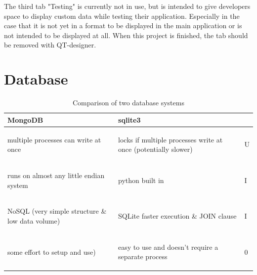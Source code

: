 \documentclass[]{scrreprt}
\begin{document}
	The third tab "Testing" is currently not in use, but is intended to give developers space to display custom data while testing their application. Especially in the case that it is not yet in a format to be displayed in the main application or is not intended to be displayed at all. When this project is finished, the tab should be removed with QT-designer.
	
\chapter{Database}
	
	\begin{table}[H]
		
		\centering
		\begin{tabular}{|l|l|l|}
			\hline
			MongoDB & sqlite3 & \\
			\hline \hline
			\begin{pbox}{6.0cm}{\vspace{.2\baselineskip}multiple processes can write at once\vspace{.3\baselineskip}} \end{pbox} & \begin{pbox}{6.0cm}{\vspace{.2\baselineskip}locks if multiple processes write at once (potentially slower)\vspace{.3\baselineskip}} \end{pbox} & U\\
			\hline
			\begin{pbox}{6.5cm}{\vspace{.2\baselineskip}runs on almost any little endian system\vspace{.3\baselineskip}} \end{pbox}
			& python built in & I\\
			\hline
			\begin{pbox}{6.0cm}{\vspace{.2\baselineskip}NoSQL (very simple structure \& low data volume)\vspace{.3\baselineskip}} \end{pbox} & \begin{pbox}{6.0cm}{\vspace{.2\baselineskip}SQLite faster execution \& JOIN clause\vspace{.3\baselineskip}} \end{pbox} & I \\
			\hline
			\begin{pbox}{6.0cm}{\vspace{.2\baselineskip}some effort to setup and use)\vspace{.3\baselineskip}} \end{pbox} & \begin{pbox}{6.0cm}{\vspace{.2\baselineskip}easy to use and doesn't require a separate process \vspace{.3\baselineskip}} \end{pbox} & 0 \\
			\hline
		\end{tabular}
	\caption{Comparison of two database systems} \label{tab:compDB}
	\end{table}
	
\end{document}
